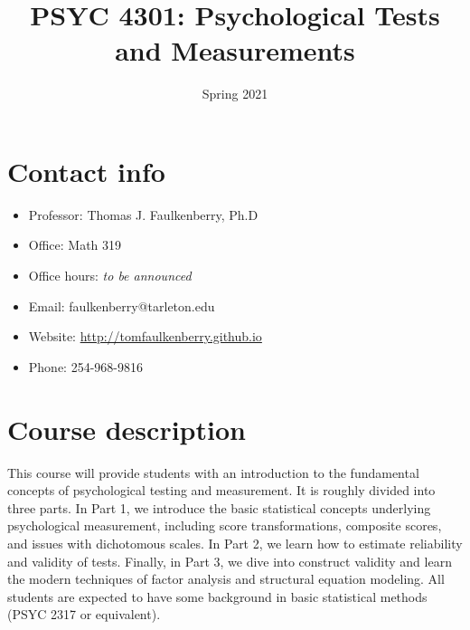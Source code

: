 \documentclass[10pt]{article}
\date{Spring 2021}
\title{PSYC 4301: Psychological Tests and Measurements}
\begin{document}
\maketitle

\section*{Contact info}
\label{sec:org8867df1}
\begin{itemize}
\item Professor: Thomas J. Faulkenberry, Ph.D
\item Office: Math 319
\item Office hours: \emph{to be announced}
\item Email: faulkenberry@tarleton.edu
\item Website: \url{http://tomfaulkenberry.github.io}
\item Phone: 254-968-9816
\end{itemize}

\section*{Course description}
\label{sec:orgaf48cae}

This course will provide students with an introduction to the fundamental concepts of psychological testing and measurement. It is roughly divided into three parts. In Part 1, we introduce the basic statistical concepts underlying psychological measurement, including score transformations, composite scores, and issues with dichotomous scales. In Part 2, we learn how to estimate reliability and validity of tests. Finally, in Part 3, we dive into construct validity and learn the modern techniques of factor analysis and structural equation modeling. All students are expected to have some background in basic statistical methods (PSYC 2317 or equivalent). 
\end{document}
